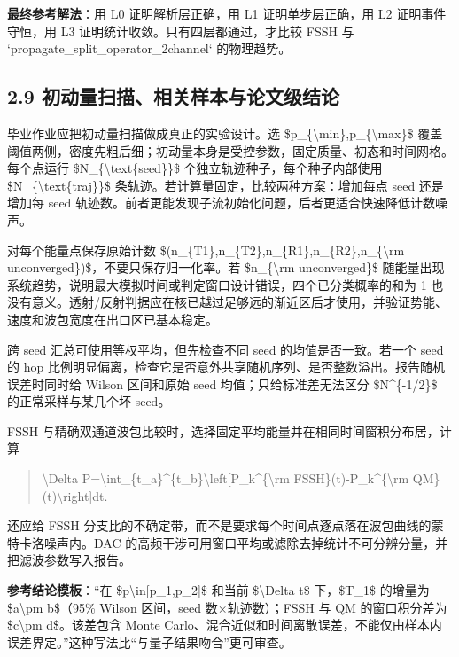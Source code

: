 \documentclass[UTF8,openany,11pt,fontset=fandol]{ctexbook}
\begin{document}
\textbf{最终参考解法}：用 L0 证明解析层正确，用 L1 证明单步层正确，用 L2
证明事件守恒，用 L3 证明统计收敛。只有四层都通过，才比较 FSSH 与
`propagate\_split\_operator\_2channel` 的物理趋势。

\subsection{\texorpdfstring{\textbf{2.9
初动量扫描、相关样本与论文级结论}}{2.9 初动量扫描、相关样本与论文级结论}}\label{ux521dux52a8ux91cfux626bux63cfux76f8ux5173ux6837ux672cux4e0eux8bbaux6587ux7ea7ux7ed3ux8bba}

毕业作业应把初动量扫描做成真正的实验设计。选
\$p\_\{\textbackslash min\},p\_\{\textbackslash max\}\$
覆盖阈值两侧，密度先粗后细；初动量本身是受控参数，固定质量、初态和时间网格。每个点运行
\$N\_\{\textbackslash text\{seed\}\}\$ 个独立轨迹种子，每个种子内部使用
\$N\_\{\textbackslash text\{traj\}\}\$
条轨迹。若计算量固定，比较两种方案：增加每点 seed 还是增加每 seed
轨迹数。前者更能发现子流初始化问题，后者更适合快速降低计数噪声。

对每个能量点保存原始计数
\$(n\_\{T1\},n\_\{T2\},n\_\{R1\},n\_\{R2\},n\_\{\textbackslash rm
unconverged\})\$，不要只保存归一化率。若 \$n\_\{\textbackslash rm
unconverged\}\$
随能量出现系统趋势，说明最大模拟时间或判定窗口设计错误，四个已分类概率的和为
1
也没有意义。透射/反射判据应在核已越过足够远的渐近区后才使用，并验证势能、速度和波包宽度在出口区已基本稳定。

跨 seed 汇总可使用等权平均，但先检查不同 seed 的均值是否一致。若一个
seed 的 hop
比例明显偏离，检查它是否意外共享随机序列、是否整数溢出。报告随机误差时同时给
Wilson 区间和原始 seed 均值；只给标准差无法区分 \$N\^{}\{-1/2\}\$
的正常采样与某几个坏 seed。

FSSH
与精确双通道波包比较时，选择固定平均能量并在相同时间窗积分布居，计算

\begin{quote}
\textbackslash Delta
P=\textbackslash int\_\{t\_a\}\^{}\{t\_b\}\textbackslash left{[}P\_k\^{}\{\textbackslash rm
FSSH\}(t)-P\_k\^{}\{\textbackslash rm QM\}(t)\textbackslash right{]}dt.
\end{quote}

还应给 FSSH
分支比的不确定带，而不是要求每个时间点逐点落在波包曲线的蒙特卡洛噪声内。DAC
的高频干涉可用窗口平均或滤除去掉统计不可分辨分量，并把滤波参数写入报告。

\textbf{参考结论模板}：``在 \$p\textbackslash in{[}p\_1,p\_2{]}\$ 和当前
\$\textbackslash Delta t\$ 下，\$T\_1\$ 的增量为 \$a\textbackslash pm
b\$（95\% Wilson 区间，seed 数×轨迹数）；FSSH 与 QM 的窗口积分差为
\$c\textbackslash pm d\$。该差包含 Monte
Carlo、混合近似和时间离散误差，不能仅由样本内误差界定。''这种写法比``与量子结果吻合''更可审查。
\end{document}
